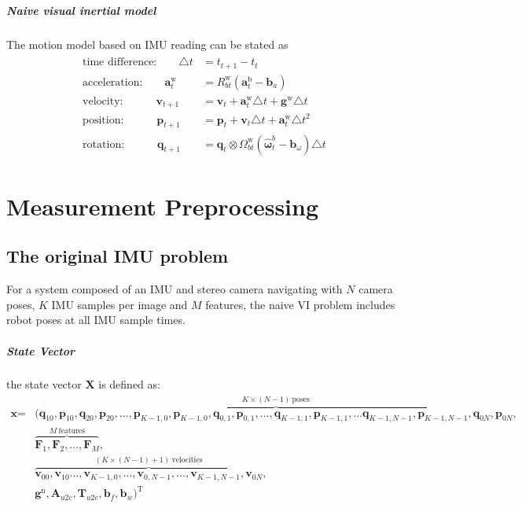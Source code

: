 \documentclass[12pt]{report}   %
\begin{document}
\paragraph{Naive visual inertial model}

The motion model based on IMU reading can be stated as
\begin{align}
\begin{split}
	\textrm{time difference:}  \qquad \triangle t & =  t_{t+1} - t_t \\
	\textrm{acceleration:} 	   \qquad \bm{a}_t^{\mathrm{w}} & = R_{bt}^{\mathrm{w}}  (\bm{a}_t^{\mathrm{b}} - \bm{b}_a) \\
	\textrm{velocity:}         \qquad \quad \bm{v}_{t+1} & = \bm{v}_{t} + \bm{a}_t^{\mathrm{w}} \triangle t + \bm{g}^{\mathrm{w}} \triangle t \\
	\textrm{position:}         \qquad \quad \bm{p}_{t+1} & = \bm{p}_{t} + \bm{v}_t \triangle t + \bm{a}_t^{\mathrm{w}} \triangle t^2\\
	\textrm{rotation:}         \qquad \quad \bm{q}_{t+1} & = \bm{q}_t \otimes  \Omega_{bt}^{\mathrm{w}}  (\hat{\bm{\omega}}^b_t - \bm{b}_\omega) \triangle t
\end{split}
\label{eq.motion_model}
\end{align}

\chapter{Measurement Preprocessing}

\section{The original IMU problem}
For a system composed of an IMU and stereo camera navigating with $N$ camera
poses, $K$ IMU samples per image and $M$ features, the naive VI problem includes
robot poses at all IMU sample times.

\paragraph{State Vector}
the state vector $\textbf{X}$ is defined as:
\begin{align*}
\textbf{x} = &(\overbrace{\textbf{q}_{10}, \textbf{p}_{10}, \textbf{q}_{20}, \textbf{p}_{20},... ,\textbf{p}_{K-1,0}, \textbf{p}_{K-1,0},\textbf{q}_{0,1}, \textbf{p}_{0,1},...,\textbf{q}_{K-1,1}, \textbf{p}_{K-1,1},... \textbf{q}_{K-1,N-1}, \textbf{p}_{K-1,N-1},\textbf{q}_{0N}, \textbf{p}_{0N}}^{K \times (N - 1) \ {\mathrm{ poses}}},\\
	 &\overbrace{\textbf{F}_{1},\textbf{F}_{2}, ..., \textbf{F}_{M}}^{M \ {\mathrm{ features}}},\\
	 &\overbrace{\textbf{v}_{00},\textbf{v}_{10} ...,\textbf{v}_{K-1,0}, ...,\textbf{v}_{0,N-1},...,\textbf{v}_{K-1,N-1}, \textbf{v}_{0N}}^{(K \times (N-1)+1)  \ {\mathrm{ velocities}}},\\
	 &\textbf{g}^{\mathrm{n}}, \textbf{A}_{u2c}, \textbf{T}_{u2c}, \textbf{b}_f, \textbf{b}_w )^{\mathrm{T}} 
	 \label{eq.state_vector}
\end{align*}
\end{document}
